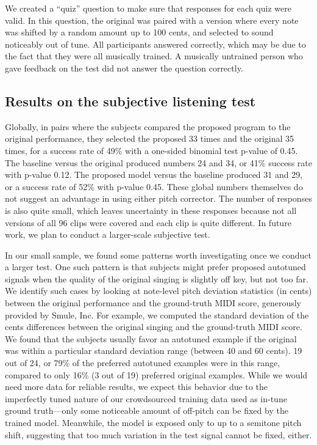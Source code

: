 We created a ``quiz'' question to make sure that responses for each quiz were valid. In this question, the original was paired with a version where every note was shifted by a random amount up to 100 cents, and selected to sound noticeably out of tune. All participants answered correctly, which may be due to the fact that they were all musically trained. A musically untrained person who gave feedback on the test did not answer the question correctly.

\subsection{Results on the subjective listening test}
\label{sec:subjective-results}
Globally, in pairs where the subjects compared the proposed program to the original performance, they selected the proposed 33 times and the original 35 times, for a success rate of 49\% with a one-sided binomial test p-value of 0.45. The baseline versus the original produced numbers 24 and 34, or 41\% success rate with p-value 0.12. The proposed model versus the baseline produced 31 and 29, or a success rate of 52\% with p-value 0.45. These global numbers themselves do not suggest an advantage in using either pitch corrector. The number of responses is also quite small, which leaves uncertainty in these responses because not all versions of all 96 clips were covered and each clip is quite different. In future work, we plan to conduct a larger-scale subjective test.

In our small sample, we found some patterns worth investigating once we conduct a larger test. One such pattern is that subjects might prefer proposed autotuned signals when the quality of the original singing is slightly off key, but not too far. We identify such cases by looking at note-level pitch deviation statistics (in cents) between the original performance and the ground-truth MIDI score, generously provided by Smule, Inc. For example, we computed the standard deviation of the cents differences between the original singing and the ground-truth MIDI score. We found that the subjects usually favor an autotuned example if the original was within a particular standard deviation range (between 40 and 60 cents). 19 out of 24, or 79\% of the preferred autotuned examples were in this range, compared to only 16\% (3 out of 19) preferred original examples. While we would need more data for reliable results, we expect this behavior due to the imperfectly tuned nature of our crowdsourced training data used as in-tune ground truth---only some noticeable amount of off-pitch can be fixed by the trained model. Meanwhile, the model is exposed only to up to a semitone pitch shift, suggesting that too much variation in the test signal cannot be fixed, either. 

